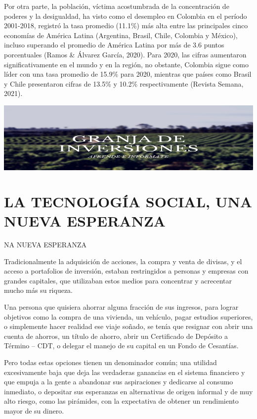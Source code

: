 \documentclass[
]{book}
\begin{document}
Por otra parte, la población, víctima acostumbrada de la concentración de poderes y la desigualdad, ha visto como el desempleo en Colombia en el período 2001-2018, registró la tasa promedio (11.1\%) más alta entre las principales cinco economías de América Latina (Argentina, Brasil, Chile, Colombia y México), incluso superando el promedio de América Latina por más de 3.6 puntos porcentuales (Ramos \& Álvarez García, 2020). Para 2020, las cifras aumentaron significativamente en el mundo y en la región, no obstante, Colombia sigue como líder con una tasa promedio de 15.9\% para 2020, mientras que países como Brasil y Chile presentaron cifras de 13.5\% y 10.2\% respectivamente (Revista Semana, 2021).

\includegraphics[width=1\linewidth,height=0.3\textheight]{imagenes/Granja1}

\hypertarget{la-tecnologuxeda-social-una-nueva-esperanza}{%
\chapter{LA TECNOLOGÍA SOCIAL, UNA NUEVA ESPERANZA}\label{la-tecnologuxeda-social-una-nueva-esperanza}}

NA NUEVA ESPERANZA

Tradicionalmente la adquisición de acciones, la compra y venta de divisas, y el acceso a portafolios de inversión, estaban restringidos a personas y empresas con grandes capitales, que utilizaban estos medios para concentrar y acrecentar mucho más su riqueza.

Una persona que quisiera ahorrar alguna fracción de sus ingresos, para lograr objetivos como la compra de una vivienda, un vehículo, pagar estudios superiores, o simplemente hacer realidad ese viaje soñado, se tenía que resignar con abrir una cuenta de ahorros, un título de ahorro, abrir un Certificado de Depósito a Término -- CDT, o delegar el manejo de su capital en un Fondo de Cesantías.

Pero todas estas opciones tienen un denominador común; una utilidad excesivamente baja que deja las verdaderas ganancias en el sistema financiero y que empuja a la gente a abandonar sus aspiraciones y dedicarse al consumo inmediato, o depositar sus esperanzas en alternativas de origen informal y de muy alto riesgo, como las pirámides, con la expectativa de obtener un rendimiento mayor de su dinero.
\end{document}
